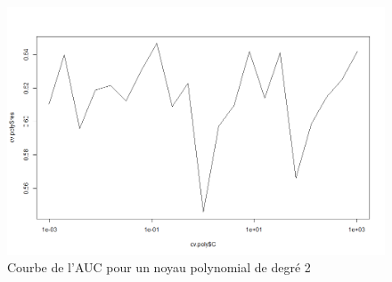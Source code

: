 \documentclass{article}
\begin{document}
\begin{figure}[!h]\centering
\includegraphics[scale=0.4]{auc.png}
\caption{Courbe de l'AUC pour un noyau polynomial de degré 2}
\label{fig:AUC Poly}
\end{figure}




 
\end{document}
